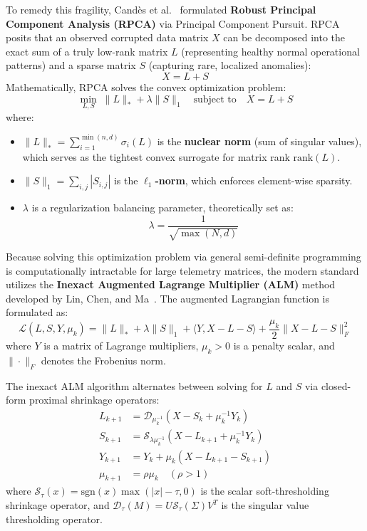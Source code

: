 To remedy this fragility, Cand{\`e}s et al.~\cite{candes2011robust} formulated \textbf{Robust Principal Component Analysis (RPCA)} via Principal Component Pursuit. RPCA posits that an observed corrupted data matrix $X$ can be decomposed into the exact sum of a truly low-rank matrix $L$ (representing healthy normal operational patterns) and a sparse matrix $S$ (capturing rare, localized anomalies):
\begin{equation}
    X = L + S
\end{equation}
Mathematically, RPCA solves the convex optimization problem:
\begin{equation}
    \min_{L, S} \; \|L\|_* + \lambda \|S\|_1 \quad \text{subject to} \quad X = L + S
\end{equation}
where:
\begin{itemize}
    \item $\|L\|_* = \sum_{i=1}^{\min(n,d)} \sigma_i(L)$ is the \textbf{nuclear norm} (sum of singular values), which serves as the tightest convex surrogate for matrix rank $\text{rank}(L)$.
    \item $\|S\|_1 = \sum_{i,j} |S_{i,j}|$ is the \textbf{$\ell_1$-norm}, which enforces element-wise sparsity.
    \item $\lambda$ is a regularization balancing parameter, theoretically set as:
    \begin{equation}
        \lambda = \frac{1}{\sqrt{\max(N, d)}}
    \end{equation}
\end{itemize}

Because solving this optimization problem via general semi-definite programming is computationally intractable for large telemetry matrices, the modern standard utilizes the \textbf{Inexact Augmented Lagrange Multiplier (ALM)} method developed by Lin, Chen, and Ma~\cite{lin2010augmented}. The augmented Lagrangian function is formulated as:
\begin{equation}
    \mathcal{L}(L, S, Y, \mu_k) = \|L\|_* + \lambda \|S\|_1 + \langle Y, X - L - S \rangle + \frac{\mu_k}{2} \|X - L - S\|_F^2
\end{equation}
where $Y$ is a matrix of Lagrange multipliers, $\mu_k > 0$ is a penalty scalar, and $\|\cdot\|_F$ denotes the Frobenius norm.

The inexact ALM algorithm alternates between solving for $L$ and $S$ via closed-form proximal shrinkage operators:
\begin{align}
    L_{k+1} &= \mathcal{D}_{\mu_k^{-1}} \left( X - S_k + \mu_k^{-1} Y_k \right) \\
    S_{k+1} &= \mathcal{S}_{\lambda \mu_k^{-1}} \left( X - L_{k+1} + \mu_k^{-1} Y_k \right) \\
    Y_{k+1} &= Y_k + \mu_k (X - L_{k+1} - S_{k+1}) \\
    \mu_{k+1} &= \rho \mu_k \quad (\rho > 1)
\end{align}
where $\mathcal{S}_{\tau}(x) = \text{sgn}(x)\max(|x| - \tau, 0)$ is the scalar soft-thresholding shrinkage operator, and $\mathcal{D}_{\tau}(M) = U \mathcal{S}_{\tau}(\Sigma) V^T$ is the singular value thresholding operator.


